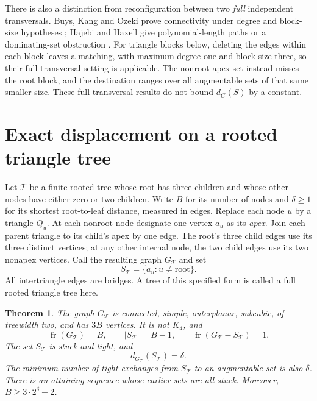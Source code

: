 \documentclass[11pt]{article}
\newtheorem{theorem}{Theorem}
\newcommand{\fr}{\operatorname{fr}}
\begin{document}
There is also a distinction from reconfiguration between two \emph{full}
independent transversals. Buys, Kang and Ozeki prove connectivity under
degree and block-size hypotheses \cite[Theorem 1.2]{BKO}; Hajebi and
Haxell give polynomial-length paths or a dominating-set obstruction
\cite[Theorem 1.4 and Corollary 1.5]{HH}. For triangle blocks below,
deleting the edges within each block leaves a matching, with maximum
degree one and block size three, so their full-transversal setting is
applicable. The nonroot-apex set instead misses the root block, and the
destination ranges over all augmentable sets of that same smaller size.
These full-transversal results do not bound $d_G(S)$ by a constant.

\section{Exact displacement on a rooted triangle tree}

Let $\mathcal T$ be a finite rooted tree whose root has three children
and whose other nodes have either zero or two children. Write $B$ for
its number of nodes and $\delta\geq1$ for its shortest root-to-leaf
distance, measured in edges. Replace each node $u$ by a triangle $Q_u$.
At each nonroot node designate one vertex $a_u$ as its \emph{apex}.
Join each parent triangle to its child's apex by one edge. The root's
three child edges use its three distinct vertices; at any other internal
node, the two child edges use its two nonapex vertices. Call the resulting
graph $G_{\mathcal T}$ and set
\[
 S_{\mathcal T}=\{a_u:u\ne\text{root}\}.
\]
All intertriangle edges are bridges. A tree of this specified form is
called a full rooted triangle tree here.

\begin{theorem}\label{thm:sharp}
The graph $G_{\mathcal T}$ is connected, simple, outerplanar, subcubic,
of treewidth two, and has $3B$ vertices. It is not $K_4$, and
\[
 \fr(G_{\mathcal T})=B,\qquad |S_{\mathcal T}|=B-1,\qquad
 \fr(G_{\mathcal T}-S_{\mathcal T})=1.
\]
The set $S_{\mathcal T}$ is stuck and tight, and
\begin{equation}\label{eq:sharp}
 d_{G_{\mathcal T}}(S_{\mathcal T})=\delta.
\end{equation}
The minimum number of tight exchanges from $S_{\mathcal T}$ to an
augmentable set is also $\delta$. There is an attaining sequence whose
earlier sets are all stuck. Moreover, $B\geq3\cdot2^\delta-2$.
\end{theorem}
\end{document}
